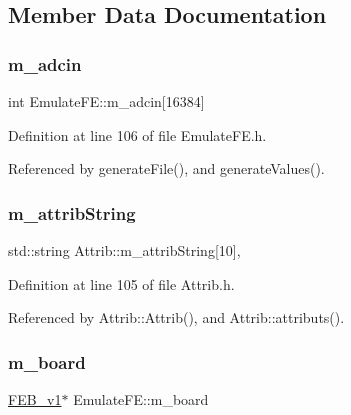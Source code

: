 \subsection{Member Data Documentation}
\mbox{\label{classEmulateFE_a647be38c790d5c0088e971aa28989589}} 
\subsubsection{\texorpdfstring{m\+\_\+adcin}{m\_adcin}}
{\footnotesize\ttfamily int Emulate\+F\+E\+::m\+\_\+adcin\mbox{[}16384\mbox{]}\hspace{0.3cm}{\ttfamily [private]}}



Definition at line 106 of file Emulate\+F\+E.\+h.



Referenced by generate\+File(), and generate\+Values().

\mbox{\label{classAttrib_a3414521d7a82476e874b25a5407b5e63}} 
\subsubsection{\texorpdfstring{m\+\_\+attrib\+String}{m\_attribString}}
{\footnotesize\ttfamily std\+::string Attrib\+::m\+\_\+attrib\+String\mbox{[}10\mbox{]}\hspace{0.3cm}{\ttfamily [protected]}, {\ttfamily [inherited]}}



Definition at line 105 of file Attrib.\+h.



Referenced by Attrib\+::\+Attrib(), and Attrib\+::attributs().

\mbox{\label{classEmulateFE_a6f3c6a104235b167e4465f4169cf8304}} 
\subsubsection{\texorpdfstring{m\+\_\+board}{m\_board}}
{\footnotesize\ttfamily \hyperlink{classFEB__v1}{F\+E\+B\+\_\+v1}$\ast$ Emulate\+F\+E\+::m\+\_\+board\hspace{0.3cm}{\ttfamily [private]}}



